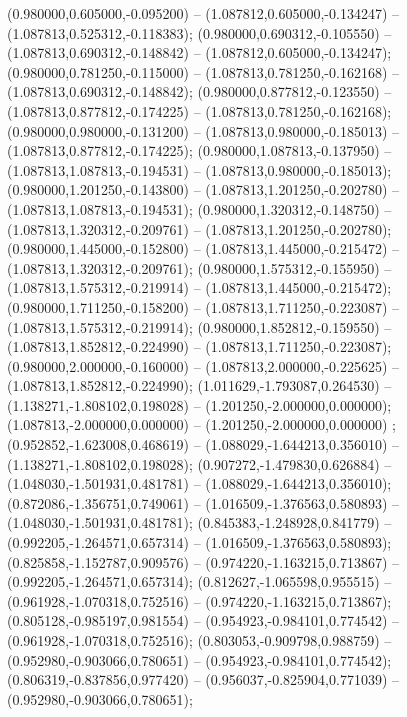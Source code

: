  (0.980000,0.605000,-0.095200) -- (1.087812,0.605000,-0.134247) -- (1.087813,0.525312,-0.118383);
 (0.980000,0.690312,-0.105550) -- (1.087813,0.690312,-0.148842) -- (1.087812,0.605000,-0.134247);
 (0.980000,0.781250,-0.115000) -- (1.087813,0.781250,-0.162168) -- (1.087813,0.690312,-0.148842);
 (0.980000,0.877812,-0.123550) -- (1.087813,0.877812,-0.174225) -- (1.087813,0.781250,-0.162168);
 (0.980000,0.980000,-0.131200) -- (1.087813,0.980000,-0.185013) -- (1.087813,0.877812,-0.174225);
 (0.980000,1.087813,-0.137950) -- (1.087813,1.087813,-0.194531) -- (1.087813,0.980000,-0.185013);
 (0.980000,1.201250,-0.143800) -- (1.087813,1.201250,-0.202780) -- (1.087813,1.087813,-0.194531);
 (0.980000,1.320312,-0.148750) -- (1.087813,1.320312,-0.209761) -- (1.087813,1.201250,-0.202780);
 (0.980000,1.445000,-0.152800) -- (1.087813,1.445000,-0.215472) -- (1.087813,1.320312,-0.209761);
 (0.980000,1.575312,-0.155950) -- (1.087813,1.575312,-0.219914) -- (1.087813,1.445000,-0.215472);
 (0.980000,1.711250,-0.158200) -- (1.087813,1.711250,-0.223087) -- (1.087813,1.575312,-0.219914);
 (0.980000,1.852812,-0.159550) -- (1.087813,1.852812,-0.224990) -- (1.087813,1.711250,-0.223087);
 (0.980000,2.000000,-0.160000) -- (1.087813,2.000000,-0.225625) -- (1.087813,1.852812,-0.224990);
 (1.011629,-1.793087,0.264530) -- (1.138271,-1.808102,0.198028) -- (1.201250,-2.000000,0.000000);
 (1.087813,-2.000000,0.000000) -- (1.201250,-2.000000,0.000000) ;
 (0.952852,-1.623008,0.468619) -- (1.088029,-1.644213,0.356010) -- (1.138271,-1.808102,0.198028);
 (0.907272,-1.479830,0.626884) -- (1.048030,-1.501931,0.481781) -- (1.088029,-1.644213,0.356010);
 (0.872086,-1.356751,0.749061) -- (1.016509,-1.376563,0.580893) -- (1.048030,-1.501931,0.481781);
 (0.845383,-1.248928,0.841779) -- (0.992205,-1.264571,0.657314) -- (1.016509,-1.376563,0.580893);
 (0.825858,-1.152787,0.909576) -- (0.974220,-1.163215,0.713867) -- (0.992205,-1.264571,0.657314);
 (0.812627,-1.065598,0.955515) -- (0.961928,-1.070318,0.752516) -- (0.974220,-1.163215,0.713867);
 (0.805128,-0.985197,0.981554) -- (0.954923,-0.984101,0.774542) -- (0.961928,-1.070318,0.752516);
 (0.803053,-0.909798,0.988759) -- (0.952980,-0.903066,0.780651) -- (0.954923,-0.984101,0.774542);
 (0.806319,-0.837856,0.977420) -- (0.956037,-0.825904,0.771039) -- (0.952980,-0.903066,0.780651);

